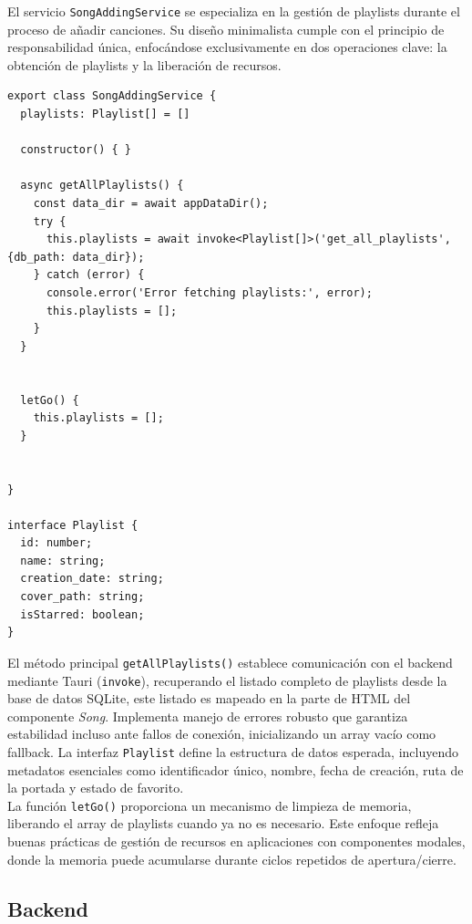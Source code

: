 \documentclass[11pt, a4paper]{article}
\begin{document}
                El servicio \verb|SongAddingService| se especializa en la gestión de playlists durante el proceso de añadir canciones. Su diseño minimalista cumple con el principio de responsabilidad única, enfocándose exclusivamente en dos operaciones clave: la obtención de playlists y la liberación de recursos.

                \begin{lstlisting}[caption={song-adding.service.ts}]
export class SongAddingService {
  playlists: Playlist[] = []

  constructor() { }

  async getAllPlaylists() {
    const data_dir = await appDataDir();
    try {
      this.playlists = await invoke<Playlist[]>('get_all_playlists', {db_path: data_dir});
    } catch (error) {
      console.error('Error fetching playlists:', error);
      this.playlists = [];
    }
  }


  letGo() {
    this.playlists = [];
  }


}

interface Playlist {
  id: number;
  name: string;
  creation_date: string;
  cover_path: string;
  isStarred: boolean;
}
                \end{lstlisting}

                El método principal \verb|getAllPlaylists()| establece comunicación con el backend mediante Tauri (\verb|invoke|), recuperando el listado completo de playlists desde la base de datos SQLite, este listado es mapeado en la parte de HTML del componente \textit{Song}. Implementa manejo de errores robusto que garantiza estabilidad incluso ante fallos de conexión, inicializando un array vacío como fallback. La interfaz \verb|Playlist| define la estructura de datos esperada, incluyendo metadatos esenciales como identificador único, nombre, fecha de creación, ruta de la portada y estado de favorito. \\

                La función \verb|letGo()| proporciona un mecanismo de limpieza de memoria, liberando el array de playlists cuando ya no es necesario. Este enfoque refleja buenas prácticas de gestión de recursos en aplicaciones con componentes modales, donde la memoria puede acumularse durante ciclos repetidos de apertura/cierre. \\

        \subsection{Backend}
\end{document}
